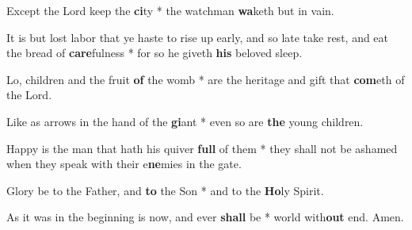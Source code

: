 \begin{multicols}{2}
	Except the Lord keep the \textbf{ci}ty * the watchman \textbf{wa}keth but in vain.

	It is but lost labor that ye haste to rise up early, and so late take rest, and eat the bread of \textbf{care}fulness * for so he giveth \textbf{his} beloved sleep.
	
	Lo, children and the fruit \textbf{of} the womb * are the heritage and gift that \textbf{com}eth of the Lord.
	
	Like as arrows in the hand of the \textbf{gi}ant * even so are \textbf{the} young children.
	
	Happy is the man that hath his quiver \textbf{full} of them * they shall not be ashamed when they speak with their e\textbf{ne}mies in the gate.
	
	Glory be to the Father, and \textbf{to} the Son * and to the \textbf{Ho}ly Spirit.
	
	As it was in the beginning is now, and ever \textbf{shall} be * world with\textbf{out} end. Amen.
\end{multicols}